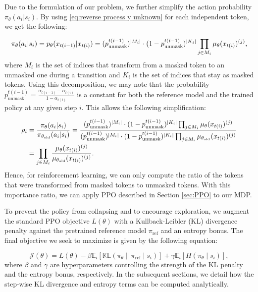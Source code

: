 Due to the formulation of our problem, we further simplify the action probability $\pi_\theta(a_i | s_i)$. By using \eqref{eq:reverse process y unknown} for each independent token, we get the following:

\begin{equation}
    \pi_\theta(a_i | s_i) = p_\theta(x_{t(i - 1)} | x_{t(i)}) = (p_{\text{unmask}}^{t(i - 1)})^{\abs{M_i}}\cdot(1 - p_{\text{unmask}}^{t(i - 1)})^{\abs{K_i}}\prod_{j\in M_i} \mu_\theta(x_{t(i)})^{(j)},
    \label{eq:DDPO policy}
\end{equation}
where $M_i$ is the set of indices that transform from a masked token to an unmasked one during a transition and $K_i$ is the set of indices that stay as masked tokens. Using this decomposition, we may note that the probability $p_{\text{unmask}}^{t(i - 1)} = \frac{\alpha_{t(i - 1)} - \alpha_{t(i)}}{1 - \alpha_{t(i)}}$ is a constant for both the reference model and the trained policy at any given step $i$. This allows the following simplification:

\begin{align*}
    \rho_i & = \frac{\pi_\theta(a_i | s_i)}{\pi_{\theta_\text{old}}(a_i | s_i)} = \frac{(p_{\text{unmask}}^{t(i - 1)})^{\abs{M_i}}\cdot (1 - p_{\text{unmask}}^{t(i - 1)})^{\abs{K_i}}\prod_{j\in M_i} \mu_\theta(x_{t(i)})^{(j)}}{(p_{\text{unmask}}^{t(i - 1)})^{\abs{M_i}}\cdot (1 - p_{\text{unmask}}^{t(i - 1)})^{\abs{K_i}}\prod_{j\in M_i} \mu_{\theta_\text{old}}(x_{t(i)})^{(j)}} \\
           & = \prod_{j\in M_i} \frac{\mu_\theta(x_{t(i)})^{(j)}}{\mu_{\theta_\text{old}}(x_{t(i)})^{(j)}}.
\end{align*}
Hence, for reinforcement learning, we can only compute the ratio of the tokens that were transformed from masked tokens to unmasked tokens. With this importance ratio, we can apply PPO described in Section \ref{sec:PPO} to our MDP.

To prevent the policy from collapsing and to encourage exploration, we augment the standard PPO objective $L(\theta)$ with a Kullback-Leibler (KL) divergence penalty against the pretrained reference model $\pi_\text{ref}$ and an entropy bonus. The final objective we seek to maximize is given by the following equation:

\begin{equation}
    \mathcal{J}(\theta) = L(\theta) - \beta\mathbb{E}_i\left[\mathbb{KL}(\pi_\theta \parallel \pi_\text{ref} \mid s_i)\right] + \gamma \mathbb{E}_i\left[H(\pi_\theta \mid s_i)\right],
    \label{eq:DDPO loss}
\end{equation}
where $\beta$ and $\gamma$ are hyperparameters controlling the strength of the KL penalty and the entropy bonus, respectively. In the subsequent sections, we detail how the step-wise KL divergence and entropy terms can be computed analytically.


